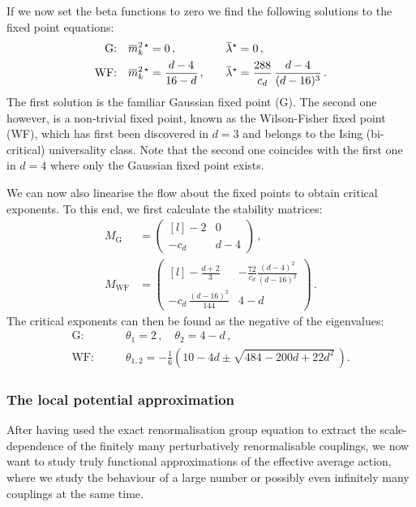 \documentclass[11pt]{book}
\newcommand{\overbar}[1]{\mkern 1.5mu\overline{\mkern-1.5mu#1\mkern-1.5mu}\mkern 1.5mu}
\numberwithin{equation}{chapter}
\begin{document}
If we now set the beta functions to zero we find the following solutions
to the fixed point equations:
\begin{alignat}{2}
  \text{G:} \quad &\overbar m_k^{2 \, \star} = 0 \,, \quad
  &&\overbar \lambda^\star = 0 \,, \\
  \text{WF:} \quad &\overbar m_k^{2 \, \star} = \frac{ d - 4 }{ 16 - d } \,, \quad
  &&\overbar \lambda^\star =  \frac{ 288 }{ c_d } \, \frac{ d - 4 }{ (d - 16)^3 } \,.
\end{alignat}
The first solution is the familiar Gaussian fixed point (G). The second one however,
is a non-trivial fixed point, known as the Wilson-Fisher fixed point (WF),
which has first been discovered in $d=3$ and belongs to the Ising (bi-critical)
universality class.
Note that the second
one coincides with the first one in $d=4$ where only the Gaussian fixed point exists.

We can now also linearise the flow about the fixed points
to obtain critical exponents. To this end, we first calculate the stability
matrices:
\begin{align}
  M_{\mathrm{G}} &=
  \begin{pmatrix*}[l]
    -2    & 0 \\
    -c_d  & d - 4
  \end{pmatrix*} \,, \\
  M_{\mathrm{WF}} &=
  \begin{pmatrix*}[l]
    -\frac{d+2}{3}                & -\frac{72}{c_d} \frac{ (d-4)^2 }{ (d-16)^2 }  \\
    -c_d \, \frac{(d-16)^2}{144}  & 4 - d
  \end{pmatrix*} \,.
\end{align}
The critical exponents can then be found as the negative of the eigenvalues:
\begin{align}
  \text{G:}&
  \qquad
  \theta_1 = 2 \,,
  \quad
  \theta_2 = 4 - d \,, \\
  \text{WF:}&
  \qquad
  \theta_{1,2} = - \frac 16 \left( 10 - 4d \pm \sqrt{ 484 - 200 d + 22 d^2 } \, \right) .
  \label{eq:critexpperttheory}
\end{align}

\subsubsection{The local potential approximation}

After having used the exact renormalisation group equation
to extract the scale-dependence of the finitely many perturbatively
renormalisable couplings, we now want to study truly functional
approximations of the effective average action, where we study the
behaviour of a large number or possibly even infinitely many couplings
at the same time.
\end{document}
